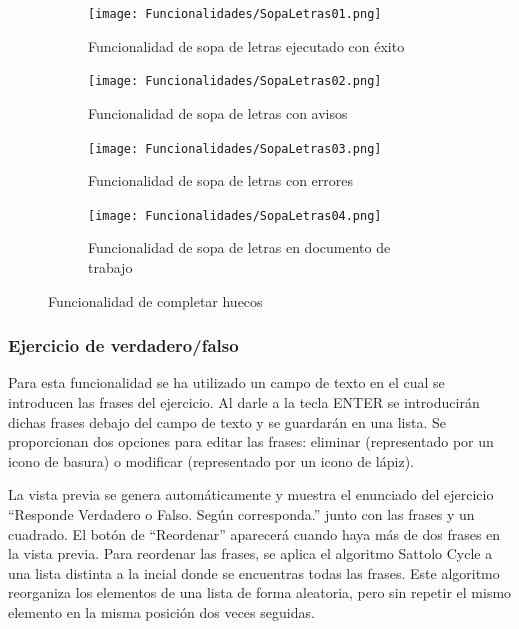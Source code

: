 \begin{figure}[ht!]
  \centering
  \begin{subfigure}{\textwidth}
    \centering
    \texttt{[image: Funcionalidades/SopaLetras01.png]}
    \caption{Funcionalidad de sopa de letras ejecutado con éxito}
    \label{fig:impsopaletras01}
  \end{subfigure}

  \begin{subfigure}{\textwidth}
    \centering
    \texttt{[image: Funcionalidades/SopaLetras02.png]}
    \caption{Funcionalidad de sopa de letras con avisos}
    \label{fig:impsopaletras02}
  \end{subfigure}

  \begin{subfigure}{\textwidth}
    \centering
    \texttt{[image: Funcionalidades/SopaLetras03.png]}
    \caption{Funcionalidad de sopa de letras con errores}
    \label{fig:impsopaletras03}
  \end{subfigure}

  \begin{subfigure}{\textwidth}
    \centering
    \texttt{[image: Funcionalidades/SopaLetras04.png]}
    \caption{Funcionalidad de sopa de letras en documento de trabajo}
    \label{fig:impsopaletras04}
  \end{subfigure}

  \caption{Funcionalidad de completar huecos}
  \label{fig:impsopaletras}
\end{figure}

\subsubsection{Ejercicio de verdadero/falso}
\label{sec:funcioVF}
Para esta funcionalidad se ha utilizado un campo de texto en el cual se introducen las frases del ejercicio. Al darle a la tecla ENTER se introducirán dichas frases debajo del campo de texto y se guardarán en una lista. Se proporcionan dos opciones para editar las frases: eliminar (representado por un icono de basura) o modificar (representado por un icono de lápiz).

La vista previa se genera automáticamente y muestra el enunciado del ejercicio ``Responde Verdadero o Falso. Según corresponda.'' junto con las frases y un cuadrado. El botón de ``Reordenar'' aparecerá cuando haya más de dos frases en la vista previa. Para reordenar las frases, se aplica el algoritmo Sattolo Cycle a una lista distinta a la incial donde se encuentras todas las frases. Este algoritmo reorganiza los elementos de una lista de forma aleatoria, pero sin repetir el mismo elemento en la misma posición dos veces seguidas.

